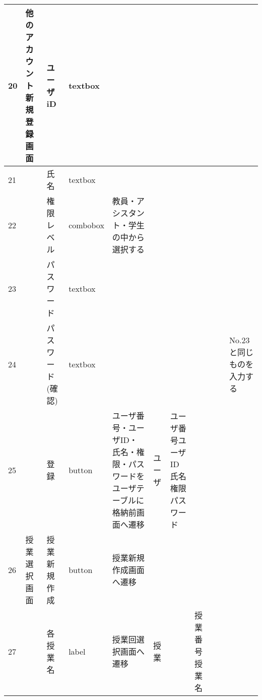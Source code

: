 \begin{landscape}
\begin{table}[]
\begin{tabular}{|l|l|l|l|l|l|l|l|l|l|l|}
20  & 他のアカウント新規登録画面 & ユーザiD            & textbox  &                                                                   &         &                       &                    &                 &                               &                                                                \\ \hline
21  &               & 氏名               & textbox  &                                                                   &         &                       &                    &                 &                               &                                                                \\ \hline
22  &               & 権限レベル            & combobox & 教員・アシスタント・学生の中から選択する                                              &         &                       &                    &                 &                               &                                                                \\ \hline
23  &               & パスワード            & textbox  &                                                                   &         &                       &                    &                 &                               &                                                                \\ \hline
24  &               & パスワード(確認)        & textbox  &                                                                   &         &                       &                    &                 &                               & No.23と同じものを入力する                                                \\ \hline
25  &               & 登録               & button   & ユーザ番号・ユーザID・氏名・権限・パスワードをユーザテーブルに格納前画面へ遷移                          & ユーザ     & ユーザ番号ユーザID氏名権限パスワード   &                    &                 &                               &                                                                \\ \hline
26  & 授業選択画面        & 授業新規作成           & button   & 授業新規作成画面へ遷移                                                       &         &                       &                    &                 &                               &                                                                \\ \hline
27  &               & 各授業名             & label    & 授業回選択画面へ遷移                                                        & 授業      &                       & 授業番号授業名            &                 &                               &                                                                \\ \hline

\end{tabular}
\end{table}
\end{landscape}
